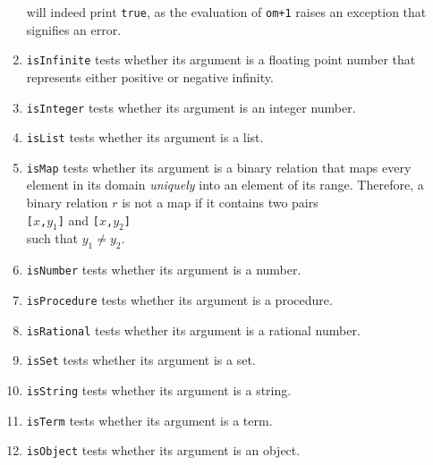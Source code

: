\begin{enumerate}
      will indeed print \texttt{true}, as the evaluation of \texttt{om+1}
      raises an exception that signifies an error.
\item \texttt{isInfinite} tests whether its argument is a floating point number that represents
      either positive or negative infinity.
\item \texttt{isInteger} tests whether its argument is an integer number.
\item \texttt{isList} tests whether its argument is a list.
\item \texttt{isMap} tests whether its argument is a binary relation that maps every
      element in its domain \emph{uniquely} into an element of its range.  Therefore, a
      binary relation $r$ is not a map if it contains two pairs
      \\[0.2cm]
      \hspace*{1.3cm}
      \texttt{[$x$,$y_1$]} \quad and \texttt{[$x$,$y_2$]}
      \\[0.2cm]
      such that $y_1 \not= y_2$.
\item \texttt{isNumber} tests whether its argument is a number.
\item \texttt{isProcedure} tests whether its argument is a procedure.
\item \texttt{isRational} tests whether its argument is a rational number.
\item \texttt{isSet} tests whether its argument is a set.
\item \texttt{isString} tests whether its argument is a string.
\item \texttt{isTerm} tests whether its argument is a term.
\item \texttt{isObject} tests whether its argument is an object.
\end{enumerate}


